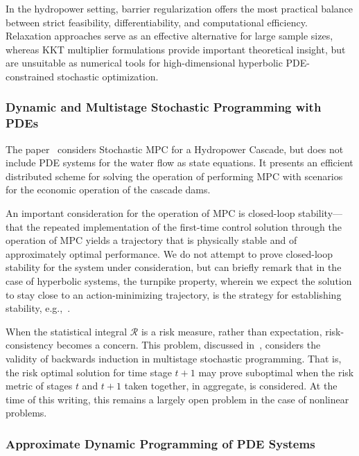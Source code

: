\documentclass{article}
\newcommand{\1}{\mathds{1}}          %
\theoremstyle{definition}
\begin{document}
\begin{sloppypar}
In the hydropower setting, barrier regularization offers the most practical balance between strict feasibility, differentiability, and computational efficiency. Relaxation approaches serve as an effective alternative for large sample sizes, whereas KKT multiplier formulations provide important theoretical insight, but are unsuitable as numerical tools for high-dimensional hyperbolic PDE-constrained stochastic optimization.

\subsubsection{Dynamic and Multistage Stochastic Programming with PDEs}

The paper~\cite{santosuosso2025distributed} considers Stochastic MPC for a Hydropower Cascade, but does not include PDE systems for the water flow as state equations. It presents an efficient distributed scheme for solving the operation of performing MPC with scenarios for the economic operation of the cascade dams.

An important consideration for the operation of MPC is closed-loop stability---that the repeated implementation of the first-time control solution through the operation of MPC yields a trajectory that is physically stable and of approximately optimal performance. We do not attempt to prove closed-loop stability for the system under consideration, but can briefly remark that in the case of hyperbolic systems, the turnpike property, wherein we expect the solution to stay close to an action-minimizing trajectory, is the strategy for establishing stability, e.g.,~\cite{gugat2023turnpike}.

When the statistical integral $\mathcal{R}$ is a risk measure, rather than expectation, risk-consistency becomes a concern. This problem, discussed in~\cite{shapiro2016time,pichler2022risk}, considers the validity of backwards induction in multistage stochastic programming. That is, the risk optimal solution for time stage $t+1$ may prove suboptimal when the risk metric of stages $t$ and $t+1$ taken together, in aggregate, is considered. At the time of this writing, this remains a largely open problem in the case of nonlinear problems. 



\subsubsection{Approximate Dynamic Programming of PDE Systems}


\end{sloppypar}
\end{document}
